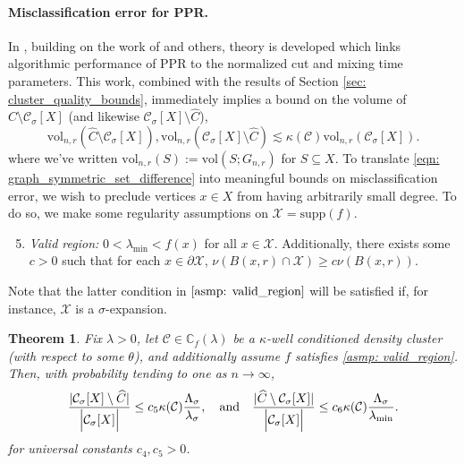 \documentclass{article}
\DeclarePairedDelimiter\abs{\lvert}{\rvert}
\newcommand{\vol}{\mathrm{vol}}
\newcommand{\1}{\mathbf{1}}
\newcommand{\Xbf}{X}             %
\newcommand{\Cbb}{\mathbb{C}}
\newcommand{\Cset}{\mathcal{C}}
\newcommand{\Csig}{\Cset_{\sigma}}
\newcommand{\Cest}{\widehat{C}}
\newcommand{\ppr}{{\sc PPR}}
\theoremstyle{aldenthm}
\newtheorem{theorem}{Theorem}
\theoremstyle{aldenrmrk}
\begin{document}
\paragraph{Misclassification error for \ppr.}

In \cite{zhu2013}, building on the work of \cite{andersen2006} and others, theory is developed which links algorithmic performance of PPR to the normalized cut and mixing time parameters. This work, combined with the results of Section \ref{sec: cluster_quality_bounds}, immediately implies a bound on the volume of $\Cest \setminus \Csig[\Xbf]$ (and likewise $\Csig[\Xbf] \setminus \Cest$),
\begin{equation}
\label{eqn: graph_symmetric_set_difference}
\vol_{n,r}(\Cest \setminus \Csig[\Xbf]), \vol_{n,r}(\Csig[\Xbf] \setminus \Cest) \lesssim \kappa(\Cset) \vol_{n,r}(\Csig[\Xbf]).
\end{equation}
where we've written $\vol_{n,r}(S) := \vol(S; G_{n,r})$ for $S \subseteq \Xbf$. 
To translate \eqref{eqn: graph_symmetric_set_difference} into meaningful bounds on misclassification error, we wish to preclude vertices $x \in \Xbf$ from having arbitrarily small degree. To do so, we make some regularity assumptions on $\mathcal{X} = \mathrm{supp}(f)$.
\begin{enumerate}[label=(A\arabic*)]
	\setcounter{enumi}{4}
	\item 
	\label{asmp: valid_region}
	\emph{Valid region:} $0 < \lambda_{\min} < f(x)$ for all $x \in \mathcal{X}$. Additionally, there exists some $c > 0$ such that for each $x \in \partial \mathcal{X}$, $\nu(B(x,r) \cap \mathcal{X}) \geq c\nu(B(x,r))$.
\end{enumerate}
Note that the latter condition in $\ref{asmp: valid_region}$ will be satisfied if, for instance, $\mathcal{X}$ is a $\sigma$-expansion. 

\begin{theorem}
	\label{thm: misclassification_rate}
	Fix $\lambda > 0$, let $\Cset \in \Cbb_f(\lambda)$ be a $\kappa$-well conditioned density cluster (with respect to some $\theta$), and additionally assume $f$ satisfies \ref{asmp: valid_region}. Then, with probability tending to one as $n \to \infty$,
	\begin{equation}
	\label{eqn: misclassification_rate_ub}
	\frac{\abs{\Csig[\Xbf] \setminus \Cest}}{\Bigl|\Csig[\Xbf]\Bigr|} \leq c_5 \kappa(\Cset) \frac{\Lambda_{\sigma}}{\lambda_{\sigma}}, \quad \textrm{and} \quad \frac{\abs{\Cest \setminus \Csig[\Xbf]}}{\Bigl|\Csig[\Xbf]\Bigr|} \leq c_6 \kappa(\Cset) \frac{\Lambda_{\sigma}}{\lambda_{\min}}.
	\end{equation}
	for universal constants $c_4, c_5 > 0$. 
\end{theorem}
\end{document}
